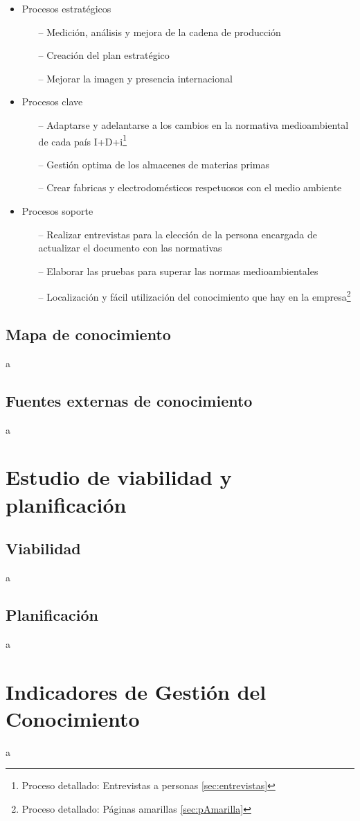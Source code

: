 \documentclass[a4paper]{article}
\begin{document}
\begin{itemize}
	\item Procesos estratégicos
	\begin{itemize}
		\item[--] Medición, análisis y mejora de la cadena de producción
		\item[--] Creación del plan estratégico
		\item[--] Mejorar la imagen y presencia internacional
	\end{itemize}
	\item Procesos clave
	\begin{itemize}
		\item[--] Adaptarse y adelantarse a los cambios en la normativa medioambiental de cada país I+D+i\footnote{Proceso detallado: Entrevistas a personas \ref{sec:entrevistas}}
		\item[--] Gestión optima de los almacenes de materias primas
		\item[--] Crear fabricas y electrodomésticos respetuosos con el medio ambiente
	\end{itemize}
	\item Procesos soporte
	\begin{itemize}
		\item[--] Realizar entrevistas para la elección de la persona encargada de actualizar el documento con las normativas
		\item[--] Elaborar las pruebas para superar las normas medioambientales
		\item[--] Localización y fácil utilización del conocimiento que hay en la empresa\footnote{Proceso detallado: Páginas amarillas \ref{sec:pAmarilla}}
	\end{itemize}
\end{itemize}




\subsection{Mapa de conocimiento}

a

\subsection{Fuentes externas de conocimiento}

a


\section{Estudio de viabilidad y planificación}

\subsection{Viabilidad}

a

\subsection{Planificación}

a

\section{Indicadores de Gestión del Conocimiento}

a
\end{document}
